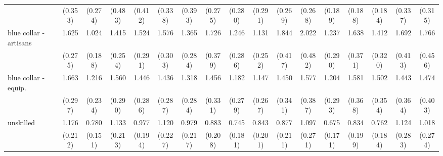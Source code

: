 {\begin{tabular}{l*{16}{c}}
                    &     (0.353)         &     (0.274)         &     (0.483)         &     (0.412)         &     (0.338)         &     (0.393)         &     (0.275)         &     (0.280)         &     (0.291)         &     (0.269)         &     (0.268)         &     (0.189)         &     (0.188)         &     (0.184)         &     (0.337)         &     (0.315)         \\
[1em]
blue collar - artisans&       1.625\sym{**} &       1.024         &       1.415         &       1.524\sym{*}  &       1.576\sym{*}  &       1.365         &       1.726\sym{*}  &       1.246         &       1.131         &       1.844\sym{**} &       2.022\sym{**} &       1.237         &       1.638\sym{*}  &       1.412         &       1.692\sym{*}  &       1.766\sym{*}  \\
                    &     (0.275)         &     (0.188)         &     (0.254)         &     (0.291)         &     (0.303)         &     (0.284)         &     (0.379)         &     (0.286)         &     (0.252)         &     (0.417)         &     (0.482)         &     (0.290)         &     (0.371)         &     (0.320)         &     (0.413)         &     (0.456)         \\
[1em]
blue collar - equip.&       1.663\sym{**} &       1.216         &       1.560\sym{*}  &       1.446         &       1.436         &       1.318         &       1.456         &       1.182         &       1.147         &       1.450         &       1.577         &       1.204         &       1.581\sym{*}  &       1.502         &       1.443         &       1.474         \\
                    &     (0.297)         &     (0.234)         &     (0.290)         &     (0.286)         &     (0.287)         &     (0.284)         &     (0.331)         &     (0.279)         &     (0.267)         &     (0.341)         &     (0.387)         &     (0.293)         &     (0.368)         &     (0.354)         &     (0.364)         &     (0.403)         \\
[1em]
unskilled           &       1.176         &       0.780         &       1.133         &       0.977         &       1.120         &       0.979         &       0.883         &       0.745         &       0.843         &       0.877         &       1.097         &       0.675         &       0.834         &       0.762         &       1.124         &       1.018         \\
                    &     (0.212)         &     (0.151)         &     (0.213)         &     (0.194)         &     (0.227)         &     (0.217)         &     (0.208)         &     (0.181)         &     (0.201)         &     (0.211)         &     (0.271)         &     (0.171)         &     (0.199)         &     (0.184)         &     (0.283)         &     (0.274)         \\

\end{tabular}}
